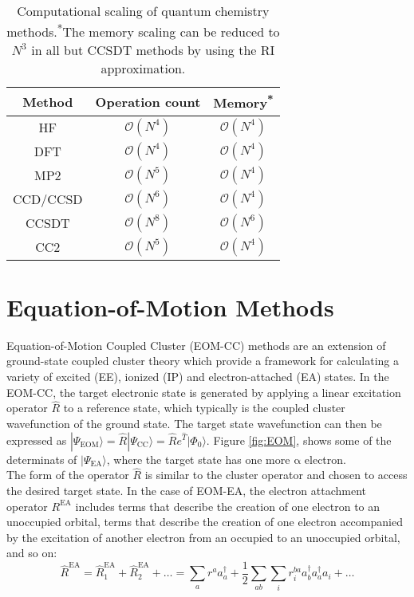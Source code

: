 \begin{table}[h!]
    \centering
    \begin{tabular}{ccc}
        Method & Operation count & Memory\textsuperscript{*} \\
        \hline
        HF & $\mathcal{O}(N^4)$ & $\mathcal{O}(N^4)$ \\
        DFT & $\mathcal{O}(N^4)$ & $\mathcal{O}(N^4)$ \\ 
        MP2 & $\mathcal{O}(N^5)$ & $\mathcal{O}(N^4)$ \\
        CCD/CCSD & $\mathcal{O}(N^6)$ & $\mathcal{O}(N^4)$ \\
        CCSDT & $\mathcal{O}(N^8)$ & $\mathcal{O}(N^6)$ \\
        CC2 & $\mathcal{O}(N^{5})$ & $\mathcal{O}(N^4)$ \\
    \end{tabular}
    \caption[Computational Scaling of selected Methods]{Computational scaling of quantum chemistry methods.\textsuperscript{*}The memory scaling can be reduced to $N^3$ in all but CCSDT methods by using the RI approximation.}
    \label{tab:qc_scaling}
\end{table}

\section{Equation-of-Motion Methods} \label{sec:eom_theory}
Equation-of-Motion Coupled Cluster (EOM-CC) methods\cite{emrich1981extension,stanton1993equation,krylov2008equation} are an extension of ground-state coupled cluster theory which provide a framework for calculating a variety of excited (EE), ionized (IP) and electron-attached (EA) states. In the EOM-CC, the target electronic state is generated by applying a linear excitation operator $\hat{R}$ to a reference state, which typically is the coupled cluster wavefunction of the ground state. The target state wavefunction can then be expressed as $|\Psi_{\mathrm{EOM}}\rangle = \hat{R} |\Psi_{\mathrm{CC}}\rangle = \hat{R} e^{\hat{T}} |\Phi_{\mathrm{0}}\rangle$. Figure \ref{fig:EOM}, shows some of the determinats of $| \Psi_{\mathrm{EA}} \rangle$, where the target state has one more $\mathrm{\alpha}$ electron. \\

The form of the operator $\hat{R}$ is similar to the cluster operator and chosen to access the desired target state. In the case of EOM-EA, the electron attachment operator $R^{\text{EA}}$ includes terms that describe the creation of one electron to an unoccupied orbital, terms that describe the creation of one electron accompanied by the excitation of another electron from an occupied to an unoccupied orbital, and so on:
\begin{equation}\label{eq:R_EA}
    \hat{R}^{\mathrm{EA}} = \hat{R}_1^{\mathrm{EA}} + \hat{R}_2^{\mathrm{EA}} + \ldots = \sum_{a} r^a a_a^{\dagger} + \frac{1}{2}\sum_{ab} \sum_{i} r^{ba}_{i} a_b^{\dagger} a_a^{\dagger} a_i + \ldots
\end{equation}

